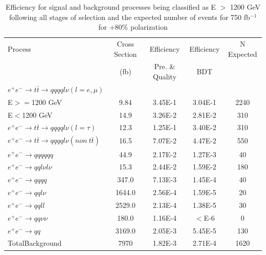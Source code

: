 \begin{table}
  \centering
  \begin{tabular}{l | c | c | c | c}
    \toprule
    Process     & Cross Section & Efficiency & Efficiency & N Expected\\
         & (fb) & Pre. \& Quality & BDT & \\
    \midrule
    $e^+e^-\rightarrow t\bar{t} \rightarrow qqqql\nu (l=e,\mu)$ &  & \\
    E$>=$1200 GeV & 9.84 & 3.45E-1 & 3.04E-1 & 2240\\
    E$<$1200 GeV & 14.9 & 3.26E-2 & 2.81E-2 & 310 \\
   \midrule
    $e^+e^-\rightarrow t\bar{t} \rightarrow qqqql\nu (l=\tau)$& 12.3 & 1.25E-1 & 3.40E-2 & 310\\
    \midrule
    $e^+e^-\rightarrow t\bar{t} \rightarrow qqqql\nu (non ~ t\bar{t})$& 16.5 & 7.07E-2 & 4.47E-2 & 550\\
    \midrule
    $e^+e^-\rightarrow qqqqqq$ & 44.9 & 2.17E-2 & 1.27E-3 & 40 \\
    \midrule
    $e^+e^-\rightarrow qql\nu l\nu$ & 15.3  & 2.44E-2 & 1.59E-2 & 180 \\
    \midrule
    $e^+e^-\rightarrow qqqq$ & 347.0 & 7.13E-3 & 1.45E-4 & 40 \\
    \midrule
    $e^+e^-\rightarrow qql\nu$ & 1644.0 & 2.56E-4 & 1.59E-5 & 20\\
    \midrule
    $e^+e^-\rightarrow qqll$ & 2529.0 & 2.13E-4 & 1.38E-5 & 30 \\
    \midrule
    $e^+e^-\rightarrow qq\nu\nu$ & 180.0 & 1.16E-4 & $<$E-6 & 0 \\
    \midrule
    $e^+e^-\rightarrow qq$ & 3169.0 & 2.05E-3 & 5.45E-5 & 130 \\
    \midrule
    \midrule
    TotalBackground & 7970 & 1.82E-3 & 2.71E-4 & 1620\\
    \bottomrule
  \end{tabular}
  \caption{Efficiency for signal and background processes being classified as E $>$ 1200 GeV following all stages of selection and the expected number of events for 750 fb$^{-1}$ for +80\% polarization}
  \label{table:topfinalefficienciespos}
\end{table}


